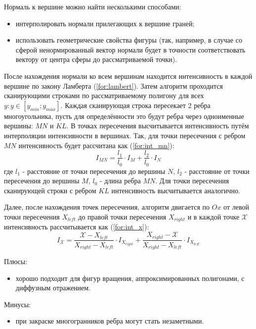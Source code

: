 Нормаль к вершине можно найти несколькими способами:
\begin{itemize}
    \item интерполировать нормали прилегающих к вершине граней;
    \item использовать геометрические свойства фигуры (так, например, в случае со сферой ненормированный вектор нормали будет в точности соответствовать вектору от центра сферы до рассматриваемой точки).
\end{itemize}

После нахождения нормали ко всем вершинам находится интенсивность в каждой вершине по закону Ламберта (\ref{for:lambert}).
Затем алгоритм проходится сканирующими строками по рассматриваемому полигону для всех $y: y \in [y_{min}; y_{max}]$. Каждая сканирующая строка пересекает 2 ребра многоугольника, пусть для определённости это будут ребра через одноименные вершины: $MN$ и $KL$. В точках пересечения высчитывается интенсивность путём интерполяции интенсивности в вершинах. Так, для точки пересечения с ребром $MN$ интенсивность будет рассчитана как (\ref{for:int_mn}):
\begin{equation}
    \label{for:int_mn}
    I_{MN} = \frac{l_1}{l_0} \cdot I_M + \frac{l_2}{l_0} \cdot I_N
\end{equation}
где $l_1$ - расстояние от точки пересечения до вершины $N$, $l_2$ - расстояние от точки пересечения до вершины $M$, $l_0$ - длина ребра $MN$.
Для точки пересечения сканирующей строки с ребром $KL$ интенсивность высчитывается аналогично.

Далее, после нахождения точек пересечения, алгоритм двигается по $Ox$ от левой точки пересечения $X_{left}$ до правой точки пересечения $X_{right}$ и в каждой точке $\mathcal{X}$ интенсивность рассчитывается как (\ref{for:int_x}):
\begin{equation}
    \label{for:int_x}
    I_{\mathcal{X}} = \frac{\mathcal{X} - X_{left}}{X_{right} - X_{left}} \cdot I_{X_{right}} + \frac{X_{right} - \mathcal{X}}{X_{right} - X_{left}} \cdot I_{X_{left}}
\end{equation}

Плюсы:
\begin{itemize}
    \item хорошо подходит для фигур вращения, аппроксимированных полигонами, с диффузным отражением.
\end{itemize}

Минусы:
\begin{itemize}
    \item при закраске многогранников ребра могут стать незаметными.
\end{itemize}

